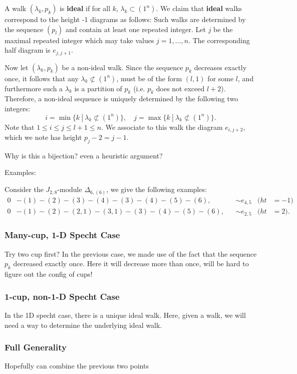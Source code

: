 \documentclass{article}
\theoremstyle{definition}
\def\l{\lambda}
\numberwithin{equation}{subsection}
\begin{document}
{{A walk $(\l_k, p_k)$ is \textbf{ideal} if for all $k$, $\l_k \subset (1^n)$. We claim that \textbf{ideal} walks correspond to the height -1 diagrams as follows: Such walks are determined by the sequence $(p_l)$ and contain at least one repeated integer. Let $j$ be the maximal repeated integer which may take values $j=1,\dots, n$. The corresponding half diagram is $e_{j,j+1}$.

Now let $(\l_k,p_k)$ be a non-ideal walk. Since the sequence $p_k$ decreases exactly once, it follows that any $\l_k\not\subset (1^n)$, must be of the form $(l,1)$ for some $l$, and furthermore such a $\l_k$ is a partition of $p_k$ (i.e. $p_k$ does not exceed $l+2$). Therefore, a non-ideal sequence is uniquely determined by the following two integers:
\[i=\min\{k \ | \ \l_k\not\subset (1^n)\}, \quad j=\max\{k \ | \ \l_k\not\subset (1^n)\}.\]
Note that $1\leq i \leq j \leq l+1\leq n$. We associate to this walk the diagram $e_{i,j+2}$, which we note has height $p_j-2=j-1$.

Why is this a bijection? even a heuristic argument? 

Examples:

Consider the $J_{2,8}$-module $\Delta_{6,(6)}$, we give the following examples:
\begin{align*}
    0&-(1)-(2)-(3)-(4)-(3)-(4)-(5)-(6), &&\sim e_{4,5} &(ht&=-1)\\
        0&-(1)-(2)-(2,1)-(3,1)-(3)-(4)-(5)-(6), &&\sim e_{2,5} &(ht&=2).\end{align*}


\subsubsection{Many-cup, 1-D Specht Case}

Try two cup first? In the previous case, we made use of the fact that the sequence $p_k$ decreased exactly once. Here it will decrease more than once, will be hard to figure out the config of cups! 

\subsubsection{1-cup, non-1-D Specht Case}

In the 1D specht case, there is a unique ideal walk. Here, given a walk, we will need a way to determine the underlying ideal walk.

\subsubsection{Full Generality}
Hopefully can combine the previous two points


}}
\end{document}
